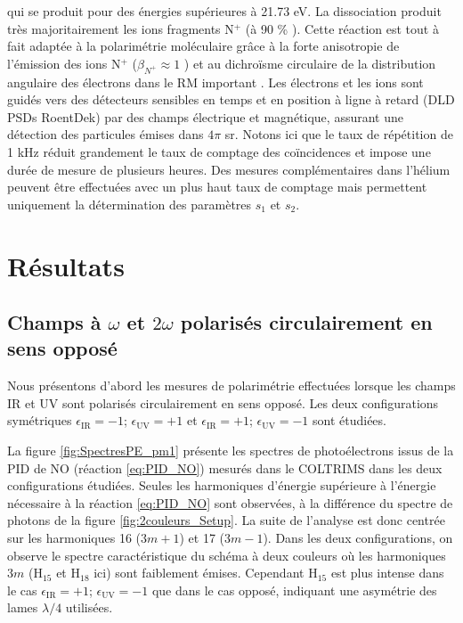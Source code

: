 qui se produit pour des énergies supérieures à 21.73 eV. La dissociation produit très majoritairement les ions fragments N$^+$ (à 90 \% ). Cette réaction est tout à fait adaptée à la polarimétrie moléculaire grâce à la forte anisotropie de  l'émission des ions N$^+$ ($\beta_{N^+} \approx 1$ ) et au dichroïsme circulaire de la distribution angulaire des électrons dans le RM important . Les électrons et les ions sont guidés vers des détecteurs sensibles en temps et en position à ligne à retard (DLD PSDs RoentDek) par des champs électrique et magnétique, assurant une détection des particules émises dans $4\pi$ sr. Notons ici que le taux de répétition de 1 kHz réduit grandement le taux de comptage des coïncidences et impose une durée de mesure de plusieurs heures. Des mesures complémentaires dans l'hélium peuvent être effectuées avec un plus haut taux de comptage mais permettent uniquement la détermination des paramètres $s_1$ et $s_2$.

\section{Résultats}
\subsection{Champs à $\omega$ et $2\omega$ polarisés circulairement en sens opposé}
Nous présentons d'abord les mesures de polarimétrie effectuées lorsque les champs IR et UV sont polarisés circulairement en sens opposé. Les deux configurations symétriques $\epsilon_{\text{IR}} = -1$; $\epsilon_{\text{UV}} = +1$ et $\epsilon_{\text{IR}} = +1$; $\epsilon_{\text{UV}} = -1$ sont étudiées.

La figure \ref{fig:SpectresPE_pm1} présente les spectres de photoélectrons issus de la PID de NO (réaction \ref{eq:PID_NO}) mesurés dans le COLTRIMS dans les deux configurations étudiées. Seules les harmoniques d'énergie supérieure à l'énergie nécessaire à la réaction \ref{eq:PID_NO} sont observées, à la différence du spectre de photons de la figure \ref{fig:2couleurs_Setup}. La suite de l'analyse est donc centrée sur les harmoniques 16 ($3m+1$) et 17 ($3m-1$). Dans les deux configurations, on observe le spectre caractéristique du schéma à deux couleurs où les harmoniques $3m$ (H$_{15}$ et H$_{18}$ ici) sont faiblement émises. Cependant H$_{15}$ est plus intense dans le cas $\epsilon_{\text{IR}} = +1$; $\epsilon_{\text{UV}} = -1$ que dans le cas opposé, indiquant une asymétrie des lames $\lambda/4$ utilisées.

